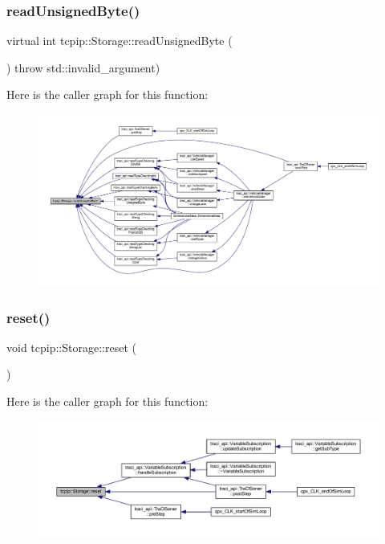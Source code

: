 \subsubsection{\texorpdfstring{read\+Unsigned\+Byte()}{readUnsignedByte()}}
{\footnotesize\ttfamily virtual int tcpip\+::\+Storage\+::read\+Unsigned\+Byte (\begin{DoxyParamCaption}{ }\end{DoxyParamCaption}) throw  std\+::invalid\+\_\+argument) \hspace{0.3cm}{\ttfamily [virtual]}}

Here is the caller graph for this function\+:
\nopagebreak
\begin{figure}[H]
\begin{center}
\leavevmode
\includegraphics[width=350pt]{classtcpip_1_1_storage_a46215cfa07dcabbdea932e4c69504019_icgraph}
\end{center}
\end{figure}
\mbox{\label{classtcpip_1_1_storage_a5f4f62ada96d7e48465eb27047c4595a}} 
\subsubsection{\texorpdfstring{reset()}{reset()}}
{\footnotesize\ttfamily void tcpip\+::\+Storage\+::reset (\begin{DoxyParamCaption}{ }\end{DoxyParamCaption})}

Here is the caller graph for this function\+:
\nopagebreak
\begin{figure}[H]
\begin{center}
\leavevmode
\includegraphics[width=350pt]{classtcpip_1_1_storage_a5f4f62ada96d7e48465eb27047c4595a_icgraph}
\end{center}
\end{figure}
\mbox{\label{classtcpip_1_1_storage_a69f9705be09f7e5be1a29f4d145f451a}} 
